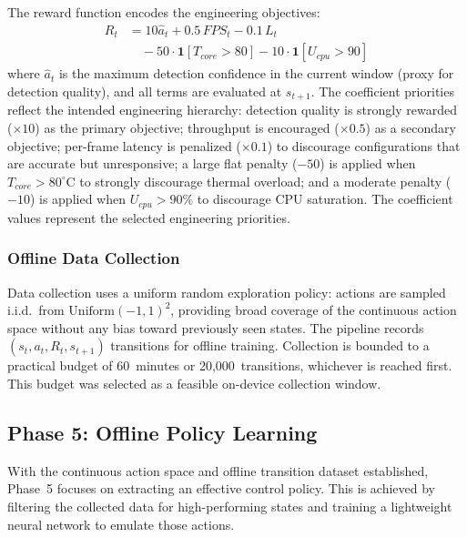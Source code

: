 \documentclass{ieeeaccess}
\begin{document}
The reward function encodes the engineering objectives:
\begin{equation}
\begin{split}
R_t &= 10\hat{a}_t + 0.5\,FPS_t - 0.1\,L_t \\
    &\quad - 50\cdot\mathbf{1}[T_{core}>80] - 10\cdot\mathbf{1}[U_{cpu}>90]
\end{split}
\end{equation}
where $\hat{a}_t$ is the maximum detection confidence in the current window
(proxy for detection quality), and all terms are evaluated at $s_{t+1}$.
The coefficient priorities reflect the intended engineering hierarchy:
detection quality is strongly rewarded ($\times 10$) as the primary objective;
throughput is encouraged ($\times 0.5$) as a secondary objective; per-frame
latency is penalized ($\times 0.1$) to discourage configurations that are
accurate but unresponsive; a large flat penalty ($-50$) is applied when
$T_{core} > 80^\circ$C to strongly discourage thermal overload; and a
moderate penalty ($-10$) is applied when $U_{cpu} > 90\%$ to discourage
CPU saturation. The coefficient values represent the selected engineering
priorities.

\subsubsection*{Offline Data Collection}

Data collection uses a uniform random exploration policy: actions are
sampled i.i.d.\ from $\mathrm{Uniform}(-1,1)^2$, providing broad coverage
of the continuous action space without any bias toward previously seen
states. The pipeline records $(s_t, a_t, R_t, s_{t+1})$ transitions for
offline training. Collection is bounded to a practical budget of 60~minutes
or 20,000~transitions, whichever is reached first. This budget was selected
as a feasible on-device collection window.



\subsection{Phase 5: Offline Policy Learning}

With the continuous action space and offline transition dataset established, Phase~5 focuses on extracting an effective control policy. This is achieved by filtering the collected data for high-performing states and training a lightweight neural network to emulate those actions.
\end{document}
